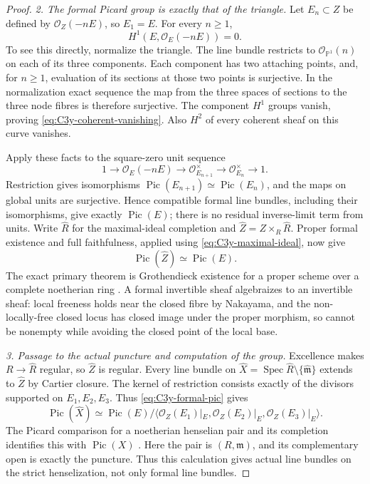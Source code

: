\begin{proof}
\emph{2. The formal Picard group is exactly that of the triangle.}
Let $E_n\subset Z$ be defined by $\mathcal O_Z(-nE)$,
so $E_1=E$. For every $n\ge1$,
\begin{equation}\label{eq:C3y-coherent-vanishing}
             H^1(E,\mathcal O_E(-nE))=0.
\end{equation}
To see this directly, normalize the triangle. The line bundle
restricts to $\mathcal O_{\mathbb P^1}(n)$ on each of its
three components. Each component has two attaching points,
and, for $n\ge1$, evaluation of its sections at those two
points is surjective. In the normalization exact sequence
the map from the three spaces of sections to the three
node fibres is therefore surjective. The component
$H^1$ groups vanish, proving \eqref{eq:C3y-coherent-vanishing}.
Also $H^2$ of every coherent sheaf on this curve vanishes.

Apply these facts to the square-zero unit sequence
\[
 1\longrightarrow\mathcal O_E(-nE)
 \longrightarrow\mathcal O_{E_{n+1}}^\times
 \longrightarrow\mathcal O_{E_n}^\times\longrightarrow1.
\]
Restriction gives isomorphisms
$\operatorname{Pic}(E_{n+1})\simeq\operatorname{Pic}(E_n)$,
and the maps on global units are surjective. Hence compatible
formal line bundles, including their isomorphisms, give
exactly $\operatorname{Pic}(E)$; there is no residual inverse-limit
term from units. Write $\widehat R$ for the maximal-ideal
completion and $\widehat Z=Z\times_R\widehat R$.
Proper formal existence and full faithfulness, applied using
\eqref{eq:C3y-maximal-ideal}, now give
\begin{equation}\label{eq:C3y-formal-pic}
                         \operatorname{Pic}(\widehat Z)\simeq\operatorname{Pic}(E).
\end{equation}
The exact primary theorem is Grothendieck existence for a
proper scheme over a complete noetherian ring
\citep[Theorem 30.27.1, Tag 088E]{rootStacksExistence}.
A formal invertible sheaf algebraizes to an invertible
sheaf: local freeness holds near the closed fibre by
Nakayama, and the non-locally-free closed locus has closed
image under the proper morphism, so cannot be nonempty
while avoiding the closed point of the local base.

\emph{3. Passage to the actual puncture and computation of the group.}
Excellence makes $R\to\widehat R$ regular, so $\widehat Z$
is regular. Every line bundle on
$\widehat X=\operatorname{Spec}\widehat R\setminus\{\widehat{\mathfrak m}\}$
extends to $\widehat Z$ by Cartier closure. The kernel
of restriction consists exactly of the divisors supported
on $E_1,E_2,E_3$. Thus \eqref{eq:C3y-formal-pic} gives
\[
 \operatorname{Pic}(\widehat X)
  \simeq\operatorname{Pic}(E)\big/
        \langle\mathcal O_Z(E_1)|_E,
                  \mathcal O_Z(E_2)|_E,
                  \mathcal O_Z(E_3)|_E\rangle.
\]
The Picard comparison for a noetherian henselian pair and
its completion identifies this with $\operatorname{Pic}(X)$
\citep[Section III, unnumbered Picard corollary, p.~573]{D_Elkik1973}.
Here the pair is $(R,\mathfrak m)$, and its complementary
open is exactly the puncture. Thus this calculation gives
actual line bundles on the strict henselization, not only
formal line bundles.


\end{proof}
